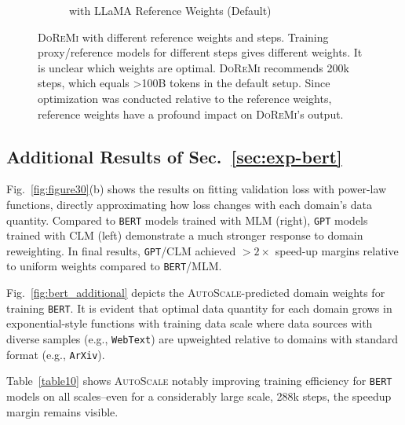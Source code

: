 \documentclass{article} %
\begin{document}
\begin{appendices}{}
\begin{figure}[h!]
\begin{subfigure}[b]{0.45\textwidth}
        \caption{with LLaMA Reference Weights (Default)}
    \end{subfigure}
    \caption{\textsc{DoReMi} with different reference weights and steps.  Training proxy/reference models for different steps gives different weights. It is unclear which weights are optimal. \textsc{DoReMi} recommends 200k steps, which equals >100B tokens in the default setup. Since optimization was conducted relative to the reference weights, reference weights have a profound impact on \textsc{DoReMi}'s output.}
    \label{fig:doremi_ref_weights}
\end{figure}



\subsection{Additional Results of Sec.~\ref{sec:exp-bert}}
\label{sec:appendix_additional_results_bert}

Fig.~\ref{fig:figure30}(b) shows the results on fitting validation loss with power-law functions, directly approximating how loss changes with each domain's data quantity. Compared to \texttt{BERT} models trained with MLM (right), \texttt{GPT} models trained with CLM (left) demonstrate a much stronger response to domain reweighting. In final results, \texttt{GPT}/CLM achieved $> 2\times$ speed-up margins relative to uniform weights compared to \texttt{BERT}/MLM. 

Fig.~\ref{fig:bert_additional} depicts the \textsc{AutoScale}-predicted domain weights for training \texttt{BERT}. It is evident that optimal data quantity for each domain grows in exponential-style functions with training data scale where data sources with diverse samples (e.g., \texttt{WebText}) are upweighted relative to domains with standard format (e.g., \texttt{ArXiv}).

Table~\ref{table10} shows \textsc{AutoScale} notably improving training efficiency for \texttt{BERT} models on all scales–even for a considerably large scale, 288k steps, the speedup margin remains visible.


\end{appendices}
\end{document}
